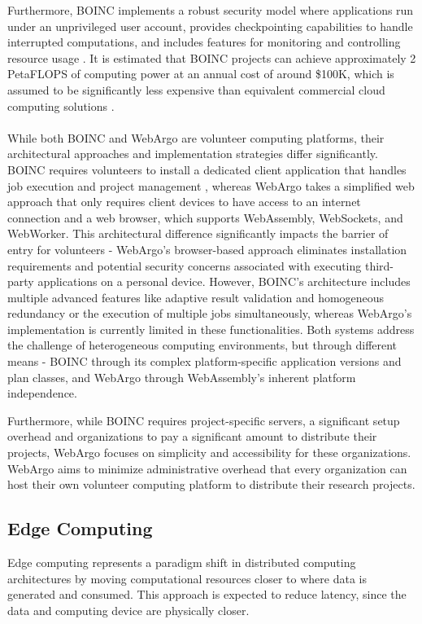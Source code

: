 Furthermore, \ac{BOINC} implements a robust security model where applications run under an unprivileged user account, provides checkpointing capabilities to handle interrupted computations, and includes features for monitoring and controlling resource usage \cite{relatedwork:boinc1}. It is estimated that \ac{BOINC} projects can achieve approximately 2 Peta\ac{FLOPS} of computing power at an annual cost of around \$100K, which is assumed to be significantly less expensive than equivalent commercial cloud computing solutions  \cite{relatedwork:boinc1}.
\\~\\
While both \ac{BOINC} and WebArgo are volunteer computing platforms, their architectural approaches and implementation strategies differ significantly. \ac{BOINC} requires volunteers to install a dedicated client application that handles job execution and project management \cite{relatedwork:boinc1}, whereas WebArgo takes a simplified web approach that only requires client devices to have access to an internet connection and a web browser, which supports WebAssembly, WebSockets, and WebWorker. This architectural difference significantly impacts the barrier of entry for volunteers - WebArgo's browser-based approach eliminates installation requirements and potential security concerns associated with executing third-party applications on a personal device. However, \ac{BOINC}'s architecture includes multiple advanced features like adaptive result validation and homogeneous redundancy or the execution of multiple jobs simultaneously, whereas WebArgo's implementation is currently limited in these functionalities. Both systems address the challenge of heterogeneous computing environments, but through different means - \ac{BOINC} through its complex platform-specific application versions and plan classes, and WebArgo through WebAssembly's inherent platform independence.

Furthermore, while \ac{BOINC} requires project-specific servers, a significant setup overhead and organizations to pay a significant amount to distribute their projects, WebArgo focuses on simplicity and accessibility for these organizations. WebArgo aims to minimize administrative overhead that every organization can host their own volunteer computing platform to distribute their research projects.

\subsection{Edge Computing}
Edge computing represents a paradigm shift in distributed computing architectures by moving computational resources closer to where data is generated and consumed. This approach is expected to reduce latency, since the data and computing device are physically closer. 

